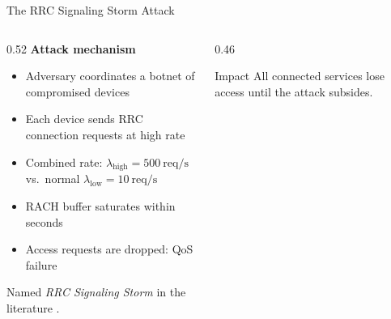 \documentclass[aspectratio=169,t]{beamer}
\begin{document}
\begin{frame}{The RRC Signaling Storm Attack}

  \begin{columns}[T]
    \begin{column}{0.52\textwidth}
      \textbf{Attack mechanism}

      \vspace{6pt}
      \begin{itemize}\setlength\itemsep{5pt}
        \item Adversary coordinates a botnet of compromised devices
        \item Each device sends RRC connection requests at high rate
        \item Combined rate: $\lambda_{\mathrm{high}} = 500\ \mathrm{req/s}$
              vs.\ normal $\lambda_{\mathrm{low}} = 10\ \mathrm{req/s}$
        \item RACH buffer saturates within seconds
        \item Access requests are dropped: \alert{QoS failure}
      \end{itemize}

      \vspace{8pt}
      Named \alert{\emph{RRC Signaling Storm}} in the literature \cite{b1}.
    \end{column}

    \begin{column}{0.46\textwidth}
      \begin{center}
      \end{center}

      \vspace{8pt}
      \begin{alertblock}{\small Impact}
        \small
        All connected services lose access until the attack subsides.
      \end{alertblock}
    \end{column}
  \end{columns}

\end{frame}
\end{document}
